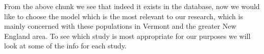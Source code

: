 \documentclass[]{article}
\newenvironment{Shaded}{\begin{snugshade}}{\end{snugshade}}
\newcommand{\KeywordTok}[1]{\textcolor[rgb]{0.13,0.29,0.53}{\textbf{#1}}}
\newcommand{\DataTypeTok}[1]{\textcolor[rgb]{0.13,0.29,0.53}{#1}}
\newcommand{\StringTok}[1]{\textcolor[rgb]{0.31,0.60,0.02}{#1}}
\newcommand{\ControlFlowTok}[1]{\textcolor[rgb]{0.13,0.29,0.53}{\textbf{#1}}}
\newcommand{\OperatorTok}[1]{\textcolor[rgb]{0.81,0.36,0.00}{\textbf{#1}}}
\newcommand{\NormalTok}[1]{#1}
\begin{document}
From the above chunk we see that indeed it exists in the database, now
we would like to choose the model which is the most relevant to our
research, which is mainly concerned with these populations in Vermont
and the greater New England area. To see which study is most appropriate
for our purposes we will look at some of the info for each study.

\begin{Shaded}
\end{Shaded}
\end{document}
